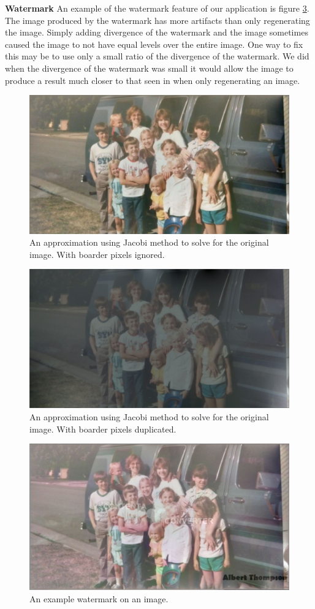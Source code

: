 \documentclass[10pt,twopage]{acmsiggraph}
\begin{document}
{\bf Watermark} An example of the watermark feature of our application is figure \ref{mask}. The image produced by the watermark has more artifacts than only regenerating the image. Simply adding divergence of the watermark and the image sometimes caused the image to not have equal levels over the entire image. One way to fix this may be to use only a small ratio of the divergence of the watermark. We did when the divergence of the watermark was small it would allow the image to produce a result much closer to that seen in when only regenerating an image.

\begin{figure}
\centering
\includegraphics[width=.44\textwidth]{fig/familyResult.jpg}
\caption{An approximation using Jacobi method to solve for the original image. With boarder pixels ignored.}
\label{familyResult}
\end{figure}

\begin{figure}
\centering
\includegraphics[width=.44\textwidth]{fig/familyBoarder.jpg}
\caption{An approximation using Jacobi method to solve for the original image. With boarder pixels duplicated.}
\label{familyBoarder}
\end{figure}

\begin{figure}
\centering
\includegraphics[width=.44\textwidth]{fig/mask.jpg}
\caption{An example watermark on an image.}
\label{mask}
\end{figure}
\end{document}
